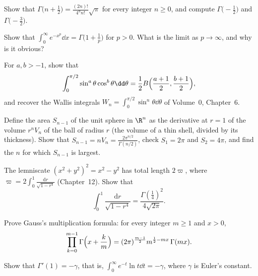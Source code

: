 \begin{exercise}[$\star$]\label{ex:halfint}
Show that $\Gamma\bigl(n+\frac12\bigr)=\frac{(2n)!}{4^nn!}\sqrt\pi$ for every integer $n\ge0$, and compute $\Gamma\bigl(-\frac12\bigr)$ and
$\Gamma\bigl(-\frac32\bigr)$.
\end{exercise}

\begin{exercise}[$\star$]\label{ex:expp}
Show that $\int_0^\infty e^{-x^p}\dd x=\Gamma\bigl(1+\frac1p\bigr)$ for $p>0$. What is the limit as $p\to\infty$, and why is it obvious?
\end{exercise}

\begin{exercise}[$\star\star$]\label{ex:sincos}
For $a,b>-1$, show that
\[
\int_0^{\pi/2}\sin^a\theta\cos^b\theta\dd\theta=\frac12B\Bigl(\frac{a+1}2,\frac{b+1}2\Bigr),
\]
and recover the Wallis integrals $W_n=\int_0^{\pi/2}\sin^n\theta\dd\theta$ of Volume~0, Chapter~6.
\end{exercise}

\begin{exercise}[$\star\star$]\label{ex:sphere}
Define the area $S_{n-1}$ of the unit sphere in $\R^n$ as the derivative at $r=1$ of the volume $r^nV_n$ of the ball of radius $r$ (the
volume of a thin shell, divided by its thickness). Show that $S_{n-1}=nV_n=\frac{2\pi^{n/2}}{\Gamma(n/2)}$, check $S_1=2\pi$ and $S_2=4\pi$, and
find the $n$ for which $S_{n-1}$ is largest.
\end{exercise}

\begin{exercise}[$\star\star$]\label{ex:lemniscate}
The lemniscate $(x^2+y^2)^2=x^2-y^2$ has total length $2\varpi$, where $\varpi=2\int_0^1\frac{\mathrm dr}{\sqrt{1-r^4}}$ (Chapter~12). Show that
\[
\int_0^1\frac{\mathrm dr}{\sqrt{1-r^4}}=\frac{\Gamma(\frac14)^2}{4\sqrt{2\pi}}.
\]
\end{exercise}

\begin{exercise}[$\star\star\star$]\label{ex:multiplication}
Prove Gauss's multiplication formula: for every integer $m\ge1$ and $x>0$,
\[
\prod_{k=0}^{m-1}\Gamma\Bigl(x+\frac km\Bigr)=(2\pi)^{\frac{m-1}2}m^{\frac12-mx}\,\Gamma(mx).
\]
\end{exercise}

\begin{exercise}[$\star\star\star$]\label{ex:digamma}
Show that $\Gamma'(1)=-\gamma$, that is, $\int_0^\infty e^{-t}\ln t\dd t=-\gamma$, where $\gamma$ is Euler's constant.
\end{exercise}

